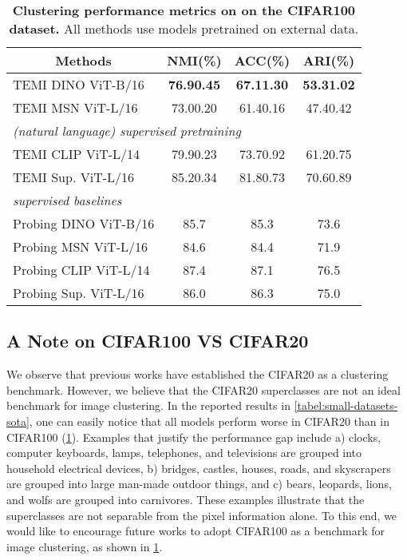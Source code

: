 \documentclass{bmvc2k}
\begin{document}
 \begin{table}[h]
\begin{center}
  
		\begin{tabular}{ l c c c }
			\toprule
   \multicolumn{1}{c}{Methods} & NMI(\%)  & ACC(\%) & ARI(\%) \\
\hline    
	TEMI DINO ViT-B/16 &  \textbf{76.90.45} &  \textbf{67.11.30} &  \textbf{53.31.02}   \\    	
    TEMI MSN ViT-L/16    &73.00.20 &  61.40.16 &  47.40.42  \\
\hline 
   \multicolumn{4}{l}{\textit{(natural language) supervised pretraining}}\\

TEMI CLIP ViT-L/14 &  79.90.23 &  73.70.92 &  61.20.75       \\
TEMI Sup. ViT-L/16  &85.20.34 &  81.80.73 &  70.60.89  \\
		\hline \hline
   \multicolumn{4}{l}{\textit{supervised baselines}}\\
  \multicolumn{1}{l}{Probing DINO ViT-B/16 }      & 85.7 & 85.3 & 73.6  \\ 

    \multicolumn{1}{l}{Probing MSN ViT-L/16}   & 84.6 & 84.4 & 71.9  \\

    \multicolumn{1}{l}{Probing CLIP ViT-L/14}        & 87.4 & 87.1 & 76.5  \\ 
     
   \multicolumn{1}{l}{Probing Sup. ViT-L/16}      & 86.0 & 
86.3 & 75.0     \\ 
			\bottomrule
		\end{tabular}\end{center}	
	\caption{\textbf{Clustering performance metrics on on the CIFAR100 dataset.} All methods use models pretrained on external data.}
    \label{tabel:cifar100-only}
\end{table}
 
\subsection{A Note on CIFAR100 VS CIFAR20}
We observe that previous works have established the CIFAR20 as a clustering benchmark. However, we believe that the CIFAR20 superclasses are not an ideal benchmark for image clustering. In the reported results in \cref{tabel:small-datasets-sota}, one can easily notice that all models perform worse in CIFAR20 than in CIFAR100 (\cref{tabel:cifar100-only}). Examples that justify the performance gap include a) clocks, computer keyboards, lamps, telephones, and televisions are grouped into household electrical devices, b) bridges, castles, houses, roads, and skyscrapers are grouped into large man-made outdoor things, and c) bears, leopards, lions, and wolfs are grouped into carnivores. These examples illustrate that the superclasses are not separable from the pixel information alone. To this end, we would like to encourage future works to adopt CIFAR100 as a benchmark for image clustering, as shown in \cref{tabel:cifar100-only}. 
\end{document}
